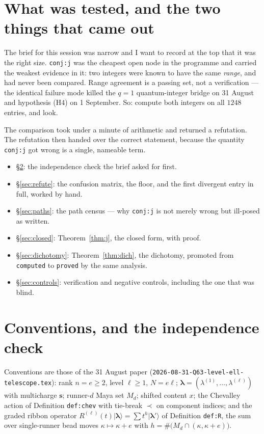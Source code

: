 \documentclass[11pt]{article}
\theoremstyle{definition}
\theoremstyle{remark}
\newcommand{\bl}{\boldsymbol{\lambda}}
\newcommand{\bs}{\mathbf{s}}
\newcommand{\ket}[1]{\lvert #1 \rangle}
\begin{document}
\section{What was tested, and the two things that came out}\label{sec:summary}

The brief for this session was narrow and I want to record at the top that it was the
right size. \texttt{conj:j} was the cheapest open node in the programme and carried the
weakest evidence in it: two integers were known to have the same \emph{range}, and had
never been compared. Range agreement is a passing set, not a verification --- the
identical failure mode killed the $q=1$ quantum-integer bridge on 31 August and
hypothesis (H4) on 1 September. So: compute both integers on all $1248$ entries, and
look.

The comparison took under a minute of arithmetic and returned a refutation. The
refutation then handed over the correct statement, because the quantity
\texttt{conj:j} got wrong is a single, nameable term.

\begin{itemize}
\item \S\ref{sec:indep}: the independence check the brief asked for first.
\item \S\ref{sec:refute}: the confusion matrix, the floor, and the first divergent
entry in full, worked by hand.
\item \S\ref{sec:paths}: the path census --- why \texttt{conj:j} is not merely wrong
but ill-posed as written.
\item \S\ref{sec:closed}: Theorem~\ref{thm:j}, the closed form, with proof.
\item \S\ref{sec:dichotomy}: Theorem~\ref{thm:dich}, the dichotomy, promoted from
\texttt{computed} to \texttt{proved} by the same analysis.
\item \S\ref{sec:controls}: verification and negative controls, including the one that
was blind.
\end{itemize}

\section{Conventions, and the independence check}\label{sec:indep}

Conventions are those of the 31 August paper
(\texttt{2026-08-31-Q63-level-ell-telescope.tex}): rank $n=e\ge2$, level $\ell\ge1$,
$N=e\ell$; $\bl=(\lambda^{(1)},\dots,\lambda^{(\ell)})$ with multicharge $\bs$; runner-$d$
Maya set $M_d$; shifted content $x$; the Chevalley action of Definition \texttt{def:chev}
with tie-break $\prec$ on component indices; and the graded ribbon operator
$R^{(\ell)}(t)\ket{\bl}=\sum t^{h}\ket{\bl'}$ of Definition \texttt{def:R}, the sum over
single-runner bead moves $\kappa\mapsto\kappa+e$ with $h=\#\big(M_d\cap(\kappa,\kappa+e)\big)$.
\end{document}
